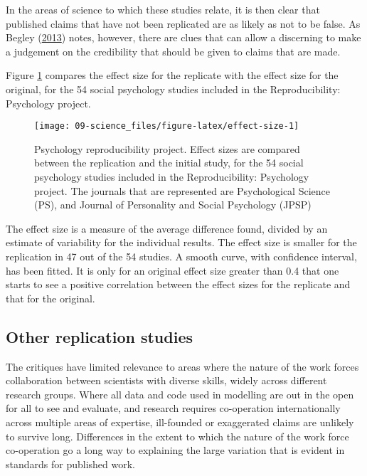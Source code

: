 \documentclass[
  10ptls,
  b5paper]{book}
\begin{document}
In the areas of science to which these studies relate,
it is then clear that published claims that have not
been replicated are as likely as not to be false. As
Begley (\protect\hyperlink{ref-r2_begley_2013}{2013}) notes, however, there are clues that
can allow a discerning to make a judgement on the
credibility that should be given to claims that are
made.

Figure \ref{fig:effect-size} compares the effect size
for the replicate with the effect size for the original,
for the 54 social psychology studies included in the
Reproducibility: Psychology project.

\begin{figure}[H]

{\centering \texttt{[image: 09-science\_files/figure-latex/effect-size-1]} 

}

\caption{Psychology reproducibility project. Effect sizes are
compared between the replication and the initial study, for the 
54 social psychology studies included in the Reproducibility:
Psychology project. The journals that are represented are 
Psychological Science (PS), and Journal of Personality and 
Social Psychology (JPSP)}\label{fig:effect-size}
\end{figure}

The effect size is a measure of the average difference found,
divided by an estimate of variability for the individual
results. The effect size is smaller for the replication in 47
out of the 54 studies. A smooth curve, with confidence interval,
has been fitted. It is only for an original effect size
greater than 0.4 that one starts to see a positive correlation
between the effect sizes for the replicate and that for the
original.

\hypertarget{other-replication-studies}{%
\subsection*{Other replication studies}\label{other-replication-studies}}

The critiques have limited relevance to areas where the nature
of the work forces collaboration between scientists with
diverse skills, widely across different research groups.
Where all data and code used in modelling are out in the open
for all to see and evaluate, and research requires co-operation
internationally across multiple areas of expertise, ill-founded
or exaggerated claims are unlikely to survive long. Differences
in the extent to which the nature of the work force co-operation
go a long way to explaining the large variation that is evident
in standards for published work.
\end{document}
